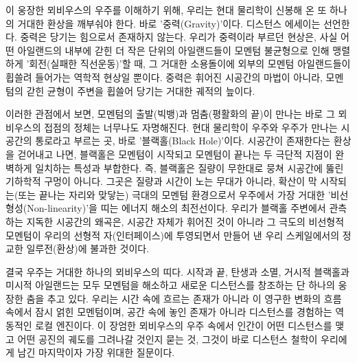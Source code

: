 이 웅장한 뫼비우스의 우주를 이해하기 위해, 우리는 현대 물리학이 신봉해 온 또 하나의 거대한 환상을 깨부숴야 한다. 바로 '중력(Gravity)'이다. 디스턴스 에세이는 선언한다. 중력은 당기는 힘으로서 존재하지 않는다. 우리가 중력이라 부르던 현상은, 사실 어떤 아일랜드의 내부에 갇힌 더 작은 단위의 아일랜드들이 모멘텀 불균형으로 인해 맹렬하게 '회전(실패한 직선운동)'할 때, 그 거대한 소용돌이에 외부의 모멘텀 아일랜드들이 휩쓸려 들어가는 역학적 현상일 뿐이다. 중력은 휘어진 시공간의 마법이 아니라, 모멘텀의 갇힌 균형이 주변을 휩쓸어 당기는 거대한 궤적의 늪이다.

이러한 관점에서 보면, 모멘텀의 출발(빅뱅)과 멈춤(평활화의 끝)이 만나는 바로 그 뫼비우스의 접점의 정체는 너무나도 자명해진다. 현대 물리학이 우주와 우주가 만나는 시공간의 통로라고 부르는 곳, 바로 '블랙홀(Black Hole)'이다. 시공간이 존재한다는 환상을 걷어내고 나면, 블랙홀은 모멘텀이 시작되고 모멘텀이 끝나는 두 극단적 지점이 완벽하게 일치하는 특성과 부합한다. 즉, 블랙홀은 질량이 무한대로 뭉쳐 시공간에 뚫린 기하학적 구멍이 아니다. 그곳은 질량과 시간이 노는 무대가 아니라, 확산이 막 시작되는(또는 끝나는 자리와 맞닿는) 극대의 모멘텀 환경으로서 우주에서 가장 거대한 '비선형성(Non-linearity)'을 띠는 에너지 해소의 최전선이다. 우리가 블랙홀 주변에서 관측하는 지독한 시공간의 왜곡은, 시공간 자체가 휘어진 것이 아니라 그 극도의 비선형적 모멘텀이 우리의 선형적 자(인터페이스)에 투영되면서 만들어 낸 우리 스케일에서의 정교한 일루전(환상)에 불과한 것이다.

결국 우주는 거대한 하나의 뫼비우스의 띠다. 시작과 끝, 탄생과 소멸, 거시적 블랙홀과 미시적 아일랜드는 모두 모멘텀을 해소하고 새로운 디스턴스를 창조하는 단 하나의 웅장한 춤을 추고 있다. 우리는 시간 속에 흐르는 존재가 아니라 이 영구한 변화의 흐름 속에서 잠시 얽힌 모멘텀이며, 공간 속에 놓인 존재가 아니라 디스턴스를 경험하는 역동적인 로컬 엔진이다.
이 장엄한 뫼비우스의 우주 속에서 인간이 어떤 디스턴스를 맺고 어떤 공진의 궤도를 그려나갈 것인지 묻는 것, 그것이 바로 디스턴스 철학이 우리에게 남긴 마지막이자 가장 위대한 질문이다.